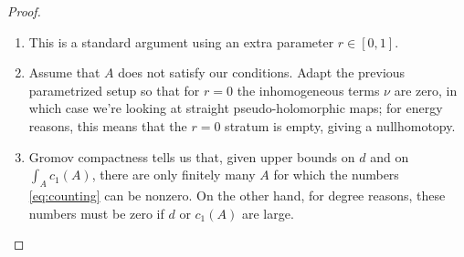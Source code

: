 \documentclass[10pt,a4paper]{amsart}
\newcommand{\skpt}{\par\smallskip}
\theoremstyle{plain}
\theoremstyle{definition}
\begin{document}
\skpt
\begin{proof}
\begin{enumerate}
\item
This is a standard argument using an extra parameter $r \in [0,1]$.

\item
Assume that $A$ does not satisfy our conditions. Adapt the previous para\-me\-tri\-zed setup so that for $r = 0$ the inhomogeneous terms $\nu$ are zero, in which case we're looking at straight pseudo-holomorphic maps; for energy reasons, this means that the $r = 0$ stratum is empty, giving a nullhomotopy.

\item
Gromov compactness tells us that, given upper bounds on $d$ and on $\int_A c_1(A)$, there are only finitely many $A$ for which the numbers \eqref{eq:counting} can be nonzero. On the other hand, for degree reasons, these numbers must be zero if $d$ or $c_1(A)$ are large.\qedhere
\end{enumerate}
\end{proof}
\end{document}
